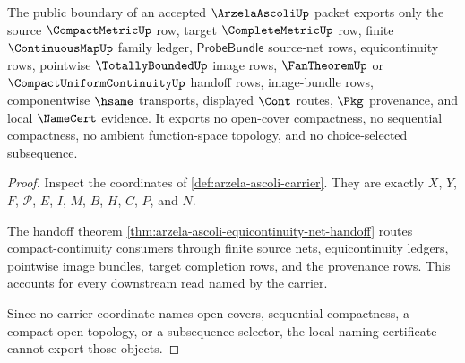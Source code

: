 \begin{theorem}
\label{thm:arzela-ascoli-non-escape-obligation}
The public boundary of an accepted $\ArzelaAscoliUp$ packet exports only the source $\CompactMetricUp$ row, target $\CompleteMetricUp$ row, finite $\ContinuousMapUp$ family ledger, $\mathsf{ProbeBundle}$ source-net rows, equicontinuity rows, pointwise $\TotallyBoundedUp$ image rows, $\FanTheoremUp$ or $\CompactUniformContinuityUp$ handoff rows, image-bundle rows, componentwise $\hsame$ transports, displayed $\Cont$ routes, $\Pkg$ provenance, and local $\NameCert$ evidence. It exports no open-cover compactness, no sequential compactness, no ambient function-space topology, and no choice-selected subsequence.
\end{theorem}
\begin{proof}
Inspect the coordinates of \autoref{def:arzela-ascoli-carrier}. They are exactly $X$, $Y$, $F$, $\mathcal{P}$, $E$, $I$, $M$, $B$, $H$, $C$, $P$, and $N$.

The handoff theorem \autoref{thm:arzela-ascoli-equicontinuity-net-handoff} routes compact-continuity consumers through finite source nets, equicontinuity ledgers, pointwise image bundles, target completion rows, and the provenance rows. This accounts for every downstream read named by the carrier.

Since no carrier coordinate names open covers, sequential compactness, a compact-open topology, or a subsequence selector, the local naming certificate cannot export those objects.
\end{proof}

